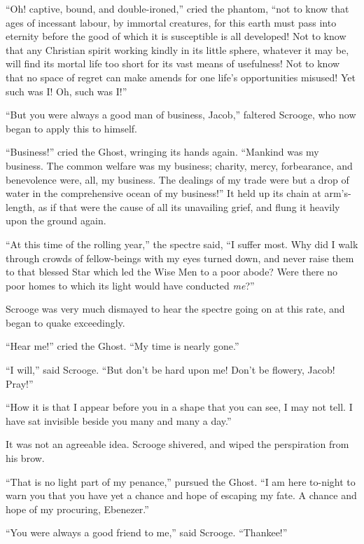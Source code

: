 \documentclass[paper=5.5in:8.5in,BCOR=10mm,twoside,DIV=15,12pt,usegeometry,openany]{scrbook} %
\begin{document}
\enquote{Oh! captive, bound, and double-ironed,} cried the phantom, \enquote{not to know that ages of incessant labour, by immortal creatures, for this earth must pass into eternity before the good of which it is susceptible is all developed! Not to know that any Christian spirit working kindly in its little sphere, whatever it may be, will find its mortal life too short for its vast means of usefulness! Not to know that no space of regret can make amends for one life's opportunities misused! Yet such was I! Oh, such was I!}

\enquote{But you were always a good man of business, Jacob,} faltered Scrooge, who now began to apply this to himself.

\enquote{Business!} cried the Ghost, wringing its hands again. \enquote{Mankind was my business. The common welfare was my business; charity, mercy, forbearance, and benevolence were, all, my business. The dealings of my trade were but a drop of water in the comprehensive ocean of my business!}
It held up its chain at arm's-length, as if that were the cause of all its unavailing grief, and flung it heavily upon the ground again.

\enquote{At this time of the rolling year,} the spectre said, \enquote{I suffer most. Why did I walk through crowds of fellow-beings with my eyes turned down, and never raise them to that blessed Star which led the Wise Men to a poor abode? Were there no poor homes to which its light would have conducted \textit{me}?}

Scrooge was very much dismayed to hear the spectre going on at this rate, and began to quake exceedingly.

\enquote{Hear me!} cried the Ghost. \enquote{My time is nearly gone.}



\enquote{I will,} said Scrooge. \enquote{But don't be hard upon me! Don't be flowery, Jacob! Pray!}

\enquote{How it is that I appear before you in a shape that you can see, I may not tell. I have sat invisible beside you many and many a day.}

It was not an agreeable idea. Scrooge shivered, and wiped the perspiration from his brow.

\enquote{That is no light part of my penance,} pursued the Ghost. \enquote{I am here to-night to warn you that you have yet a chance and hope of escaping my fate. A chance and hope of my procuring, Ebenezer.}

\enquote{You were always a good friend to me,} said Scrooge. \enquote{Thankee!}
\end{document}
